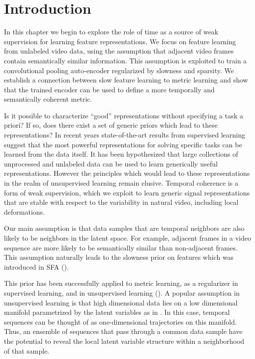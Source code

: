 \section{Introduction} 
In this chapter we begin to explore the role of time as a source of weak
supervision for learning feature representations. We focus on feature learning
from unlabeled video data, using the assumption that adjacent video frames
contain semantically similar information. This assumption is exploited to train
a convolutional pooling auto-encoder regularized by slowness and sparsity. We
establish a connection between slow feature learning to metric learning and
show that the trained encoder can be used to define a more temporally and
semantically coherent metric.   

Is it possible to characterize ``good'' representations
without specifying a task a priori? If so, does there exist a set of generic
priors which lead to these representations? In recent years state-of-the-art
results from supervised learning suggest that the most powerful representations
for solving specific tasks can be learned from the data itself. It has been
hypothesized that large collections of unprocessed and unlabeled data can be
used to learn generically useful representations. However the principles which
would lead to these representations in the realm of unsupervised learning
remain elusive. Temporal coherence is a form of weak supervision, which we
exploit to learn generic signal representations that are stable with respect to
the variability in natural video, including local deformations. 

Our main assumption is that data samples that are temporal neighbors are also
likely to be neighbors in the latent space. For example, adjacent frames in a
video sequence are more likely to be semantically similar than non-adjacent
frames. This assumption naturally leads to the slowness prior on features which
was introduced in SFA (\cite{SFA}). 

This prior has been successfully applied to metric learning, as a regularizer
in supervised learning, and in unsupervised learning
(\cite{DrLIM,DrLIMVideo,SFA}). A popular assumption in unsupervised learning is
that high dimensional data lies on a low dimensional manifold  parametrized by
the latent variables as in \cite{Bengio2012,CAE,DAE,SATAE}. In this case,
temporal sequences can be thought of as one-dimensional trajectories on this
manifold. Thus, an ensemble of sequences that pass through a common data sample
have the potential to reveal the local latent variable structure within a
neighborhood of that sample. 

